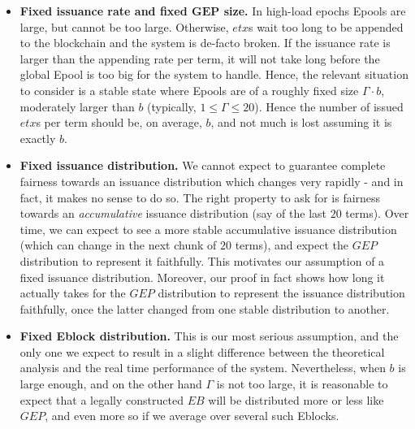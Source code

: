 \begin{itemize}
	\item \textbf{Fixed issuance rate and fixed $\pmb{GEP}$ size.} In high-load epochs Epools are large, but cannot be too large. Otherwise, $etx$s wait too long to be appended to the blockchain and the system is de-facto broken. If the issuance rate is larger than the appending rate per term, it will not take long before the global Epool is too big for the system to handle. Hence, the relevant situation to consider is a stable state where Epools are of a roughly fixed size $\Gamma\cdot b$, moderately larger than $b$ (typically, $1\leq \Gamma\leq 20$). Hence the number of issued $etx$s per term should be, on average, $b$, and not much is lost assuming it is exactly $b$.
    \item \textbf{Fixed issuance distribution.} We cannot expect \name to guarantee complete fairness towards an issuance distribution which changes very rapidly - and in fact, it makes no sense to do so. The right property to ask for is fairness towards an \textit{accumulative} issuance distribution (say of the last $20$ terms). Over time, we can expect to see a more stable accumulative issuance distribution (which can change in the next chunk of $20$ terms), and expect the $GEP$ distribution to represent it faithfully. This motivates our assumption of a fixed issuance distribution. Moreover, our proof in fact shows how long it actually takes for the $GEP$ distribution to represent the issuance distribution faithfully, once the latter changed from one stable distribution to another. %
    \item \textbf{Fixed Eblock distribution.} This is our most serious assumption, and the only one we expect to result in a slight difference between the theoretical analysis and the real time performance of the system. Nevertheless, when $b$ is large enough, and on the other hand $\Gamma$ is not too large, it is reasonable to expect that a legally constructed $EB$ will be distributed more or less like $GEP$, and even more so if we average over several such Eblocks.
\end{itemize}


